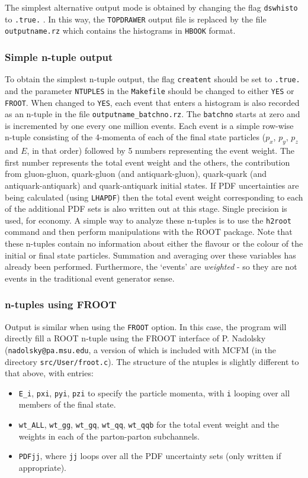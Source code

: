 \documentclass[12pt]{article}
\begin{document}
The simplest alternative output mode is obtained by changing the flag
{\tt dswhisto} to {\tt .true.} . In this way, the {\tt TOPDRAWER} output file is
replaced by the file {\tt outputname.rz} which contains the histograms in {\tt HBOOK}
format.

\subsubsection{Simple n-tuple output}
To obtain the simplest n-tuple output, the flag {\tt creatent} should be set
to {\tt .true.} and the parameter {\tt NTUPLES} in the {\tt Makefile} should be changed
to either {\tt YES} or {\tt FROOT}. When changed to {\tt YES}, each event that enters a histogram
is also recorded as an n-tuple in the file {\tt outputname\_batchno.rz}. The {\tt batchno}
starts at zero and is incremented by one every one million events. Each event
is a simple row-wise n-tuple consisting of the 4-momenta of each of the final
state particles ($p_x$, $p_y$, $p_z$ and $E$, in that order) followed by 5 numbers
representing the event weight. The first number represents the total event weight
and the others, the contribution from gluon-gluon, quark-gluon (and antiquark-gluon),
quark-quark (and antiquark-antiquark) and quark-antiquark initial states. If
PDF uncertainties are being calculated (using {\tt LHAPDF}) then the total event weight
corresponding to each of the additional PDF sets is also written out at this stage.
Single precision is used, for economy. A simple way to analyze 
these n-tuples is to use the {\tt h2root} command and then perform
manipulations with the ROOT package. Note that these n-tuples contain
no information about either the flavour or the colour of the initial or final
state particles. Summation and averaging over these variables has already been
performed. Furthermore, the `events' are {\it weighted} - so they are not events
in the traditional event generator sense.

\subsubsection{n-tuples using FROOT}
Output is similar when using the {\tt FROOT} option. In this case, the program will directly
fill a ROOT n-tuple using the FROOT interface of P. Nadolsky ({\tt nadolsky@pa.msu.edu}, a version
of which is included with MCFM (in the directory {\tt src/User/froot.c}). The structure
of the ntuples is slightly different to that above, with entries:
\begin{itemize}
\item {\tt E\_i}, {\tt pxi}, {\tt pyi}, {\tt pzi} to specify the particle momenta, with {\tt i}
 looping over all members of the final state.
\item {\tt wt\_ALL}, {\tt wt\_gg}, {\tt wt\_gq}, {\tt wt\_qq}, {\tt wt\_qqb} for the total event
 weight and the weights in each of the parton-parton subchannels.
\item {\tt PDFjj}, where {\tt jj} loops over all the PDF uncertainty sets (only written if
 appropriate).
\end{itemize}
\end{document}
